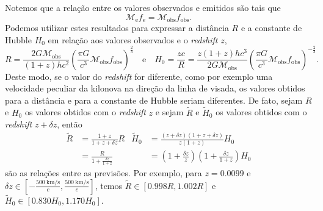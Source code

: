 Notemos que a relação entre os valores observados e emitidos são tais que
\begin{equation*}
    \mathcal{M}_\mathrm{e} f_\mathrm{e} = \mathcal{M}_\mathrm{obs} f_\mathrm{obs}.
\end{equation*}
Podemos utilizar estes resultados para expressar a distância \(R\) e a constante de Hubble \(H_0\) em relação aos valores observados e o \emph{redshift} \(z\),
\begin{equation*}
    R = \frac{2G\mathcal{M}_\mathrm{obs}}{(1+z) hc^2}\left(\frac{\pi G}{c^3}\mathcal{M}_\mathrm{obs} f_\mathrm{obs}\right)^\frac23\quad\text{e}\quad
    H_0 = \frac{zc}{R} = \frac{z(1+z)h c^3}{2G \mathcal{M}_\mathrm{obs}}\left(\frac{\pi G}{c^3} \mathcal{M}_\mathrm{obs} f_\mathrm{obs}\right)^{-\frac23}.
\end{equation*}
Deste modo, se o valor do \emph{redshift} for diferente, como por exemplo uma velocidade peculiar da kilonova na direção da linha de visada, os valores obtidos para a distância e para a constante de Hubble seriam diferentes. De fato, sejam \(R\) e \(H_0\) os valores obtidos com o \emph{redshift} \(z\) e sejam \(\tilde{R}\) e \(\tilde{H}_0\) os valores obtidos com o \emph{redshift} \(z + \delta z\), então
\begin{align*}
    \tilde{R} &= \frac{1 + z}{1 + z + \delta z} R&
    \tilde{H}_0 &= \frac{(z + \delta z)(1 + z + \delta z)}{z(1 + z)}H_0\\
                &= \frac{R}{1 + \frac{\delta z}{1+z}}&
                &= \left(1 + \frac{\delta z}{z}\right)\left(1 + \frac{\delta z}{1+z}\right) H_0
\end{align*}
são as relações entre as previsões. Por exemplo, para \(z = 0.0099\) e \(\delta z \in \left[-\frac{\SI{500}{\kilo\meter\per\second}}{c}, \frac{\SI{500}{\kilo\meter\per\second}}{c}\right]\), temos \(\tilde{R} \in [0.998 R, 1.002 R]\) e \(\tilde{H}_0 \in [0.830H_0,1.170 H_0]\).
